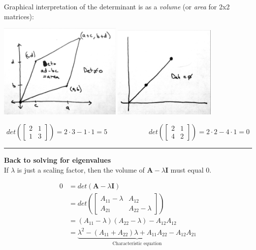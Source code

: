 \documentclass{article}
\begin{document}
Graphical interpretation of the determinant is as a \emph{volume} (or \emph{area} for 2x2 matrices):
\begin{center}
	\includegraphics[width=6cm]{figs/DetV.pdf}
		\includegraphics[width=5cm]{figs/Det0.pdf}
\end{center}
\begin{equation*}
	det\left( \begin{bmatrix} 2 & 1 \\ 1 & 3 \end{bmatrix} \right) = 2 \cdot 3 - 1 \cdot 1 = 5 \qquad \qquad \qquad   det\left( \begin{bmatrix} 2 & 1 \\ 4 & 2 \end{bmatrix} \right) = 2 \cdot 2 - 4 \cdot 1 = 0
\end{equation*}

\rule[0.5ex]{\linewidth}{1pt}

\textbf{Back to solving for eigenvalues}\\
If $\lambda$ is just a scaling factor, then the volume of $\mathbf{A}-\lambda \mathbf{I}$ must equal 0.

\begin{align*}
	0&=det(\mathbf{A}-\lambda \mathbf{I})\\
	& = det \left( \begin{bmatrix} A_{11}-\lambda  & A_{12} \\ A_{21} & A_{22} - \lambda \end{bmatrix}\right)\\
	& = (A_{11}-\lambda)(A_{22}-\lambda)- A_{12}A_{12}  \\
	& = \underbrace{\lambda^2 - (A_{11}+A_{22})\lambda + A_{11}A_{22} - A_{12} A_{21}}_{\text{Characteristic equation}}
\end{align*}
\end{document}

